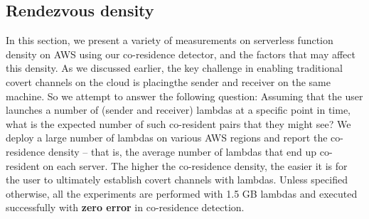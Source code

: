 \subsection{Rendezvous density}
In this section, we present a variety of measurements on serverless function
density on AWS using our co-residence detector, and the factors that may affect
this density. As we discussed earlier, the key challenge in enabling traditional
covert channels on the cloud is placingthe sender and receiver on the same
machine. So we attempt to answer the following question: Assuming that the user
launches a number of (sender and receiver) lambdas at a specific point in time,
what is the expected number of such co-resident pairs that they might see? We
deploy a large number of lambdas on various AWS regions and report the
co-residence density -- that is, the average number of lambdas that end up
co-resident on each server.  The higher the co-residence density, the easier it
is for the user to ultimately establish covert channels with lambdas. Unless
specified otherwise, all the experiments are performed with 1.5 GB lambdas and
executed successfully with \textbf{zero error} in co-residence detection.


